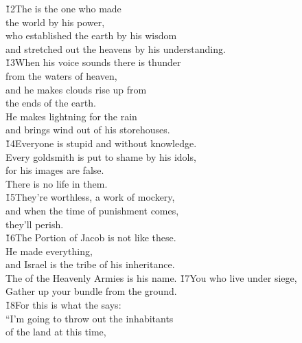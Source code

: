 \begin{poetry}
\poeml \v{12}The  is the one who made \\
\poemll    the world by his power, \\
\poeml who established the earth by his wisdom \\
\poemll    and stretched out the heavens by his understanding. \\
\poeml \v{13}When his voice sounds there is thunder \\
\poemll    from the waters of heaven, \\
\poeml and he makes clouds rise up from \\
\poemll    the ends of the earth. \\
\poeml He makes lightning for the rain \\
\poemll    and brings wind out of his storehouses. \\
\poeml \v{14}Everyone is stupid and without knowledge. \\
\poemll    Every goldsmith is put to shame by his idols, \\
\poemlll       for his images are false. \\
\poeml There is no life in them. \\
\poeml \v{15}They're worthless, a work of mockery, \\
\poemll    and when the time of punishment comes, \\
\poemlll       they'll perish. \\
\poeml \v{16}The Portion of Jacob is not like these. \\
\poemll    He made everything, \\
\poeml and Israel is the tribe of his inheritance. \\
\poemll    The  of the Heavenly Armies is his name.
\poeml \v{17}You who live under siege, \\
\poemll    Gather up your bundle from the ground. \\
\poeml \v{18}For this is what the  says: \\
\poeml ``I'm going to throw out the inhabitants \\
\poemll    of the land at this time, \\

\end{poetry}
